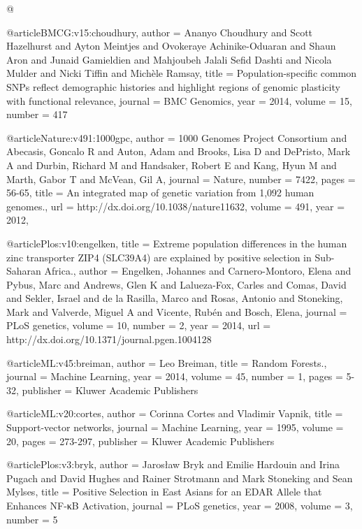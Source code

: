 @

@article{BMCG:v15:choudhury,
	author    = {Ananyo Choudhury and Scott Hazelhurst and Ayton Meintjes and Ovokeraye Achinike-Oduaran and Shaun Aron and Junaid Gamieldien and Mahjoubeh Jalali Sefid Dashti and Nicola Mulder and Nicki Tiffin and Michèle Ramsay},
	title     = {Population-specific common SNPs reflect demographic histories and highlight regions of genomic plasticity with functional relevance},
	journal   = {BMC Genomics},
	year      = {2014},
	volume    = {15},
	number    = {417}
}


@article{Nature:v491:1000gpc,
	author    = {1000 Genomes Project Consortium and Abecasis, Goncalo R and Auton, Adam and Brooks, Lisa D and {DePristo,} Mark A and Durbin, Richard M and Handsaker, Robert E and Kang, Hyun M and Marth, Gabor T and {McVean,} Gil A},
	journal   = {Nature},
	number    = {7422},
	pages     = {56-65},
	title     = {An integrated map of genetic variation from 1,092 human genomes.},
	url       = {http://dx.doi.org/10.1038/nature11632},
	volume    = {491},
	year      = {2012},
}

@article{Plos:v10:engelken,
  title       = {Extreme population differences in the human zinc transporter {ZIP4} {(SLC39A4)} are explained by positive selection in {Sub-Saharan} Africa.},
  author      = {Engelken, Johannes and {Carnero-Montoro,} Elena and Pybus, Marc and Andrews, Glen K and {Lalueza-Fox,} Carles and Comas, David and Sekler, Israel and de la Rasilla, Marco and Rosas, Antonio and Stoneking, Mark and Valverde, Miguel A and Vicente, Rub\'{e}n and Bosch, Elena},
  journal     = {{PLoS} genetics},
  volume      = {10},
  number      = {2},
  year        = {2014},
  url         = {http://dx.doi.org/10.1371/journal.pgen.1004128}
}



@article{ML:v45:breiman,
	author    = {Leo Breiman},
	title     = {Random Forests.},
	journal   = {Machine Learning},
	year      = {2014},
	volume    = {45},
	number    = {1},
	pages     = {5-32},
	publisher = {Kluwer Academic Publishers}
}

@article{ML:v20:cortes,
	author    = {Corinna Cortes and Vladimir Vapnik},
	title     = {Support-vector networks},
	journal   = {Machine Learning},
	year      = {1995},
	volume    = {20},
	pages     = {273-297},
	publisher = {Kluwer Academic Publishers}
}

@article{Plos:v3:bryk,
	author    = {Jarosław Bryk and Emilie Hardouin and Irina Pugach and David Hughes and Rainer Strotmann and Mark Stoneking and Sean Mylses},
	title     = {Positive Selection in East Asians for an EDAR Allele that Enhances NF-κB Activation},
	journal   = {{PLoS} genetics},
	year      = {2008},
	volume    = {3},
	number    = {5}
}

